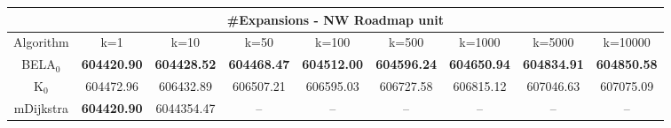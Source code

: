 \begin{tabular}{c|cccccccc}\toprule
\multicolumn{9}{c}{#Expansions - NW Roadmap unit}\\ \midrule
Algorithm & k=1 & k=10 & k=50 & k=100 & k=500 & k=1000 & k=5000 & k=10000 \\ \midrule
BELA$_0$ & \textbf{604420.90} & \textbf{604428.52} & \textbf{604468.47} & \textbf{604512.00} & \textbf{604596.24} & \textbf{604650.94} & \textbf{604834.91} & \textbf{604850.58} \\
K$_0$ & 604472.96 & 606432.89 & 606507.21 & 606595.03 & 606727.58 & 606815.12 & 607046.63 & 607075.09 \\
mDijkstra & \textbf{604420.90} & 6044354.47 & -- & -- & -- & -- & -- & -- \\ \bottomrule 
\end{tabular}
